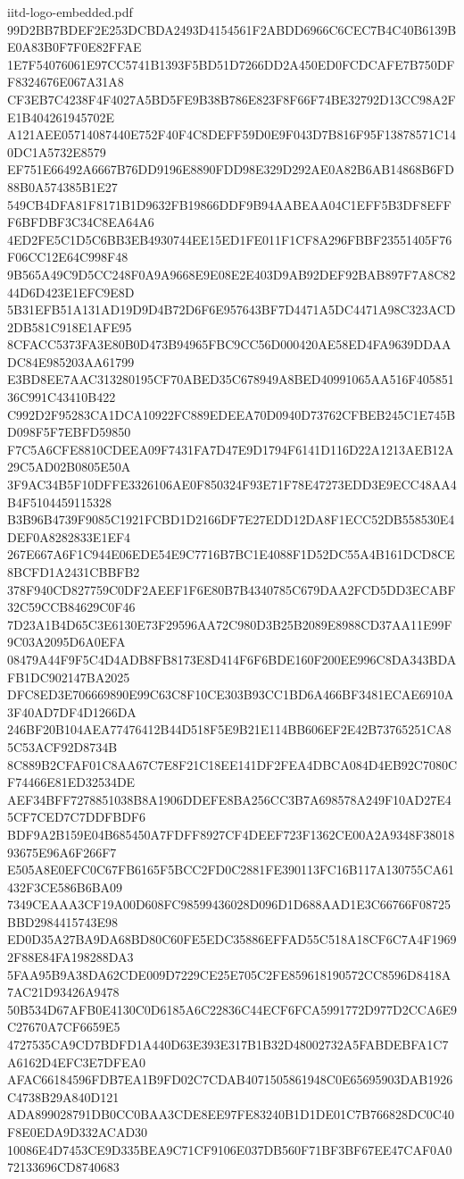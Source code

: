 \begin{filecontents*}[overwrite]{iitd-logo-embedded.pdf}
99D2BB7BDEF2E253DCBDA2493D4154561F2ABDD6966C6CEC7B4C40B6139BE0A83B0F7F0E82FFAE
1E7F54076061E97CC5741B1393F5BD51D7266DD2A450ED0FCDCAFE7B750DFF8324676E067A31A8
CF3EB7C4238F4F4027A5BD5FE9B38B786E823F8F66F74BE32792D13CC98A2FE1B404261945702E
A121AEE05714087440E752F40F4C8DEFF59D0E9F043D7B816F95F13878571C140DC1A5732E8579
EF751E66492A6667B76DD9196E8890FDD98E329D292AE0A82B6AB14868B6FD88B0A574385B1E27
549CB4DFA81F8171B1D9632FB19866DDF9B94AABEAA04C1EFF5B3DF8EFFF6BFDBF3C34C8EA64A6
4ED2FE5C1D5C6BB3EB4930744EE15ED1FE011F1CF8A296FBBF23551405F76F06CC12E64C998F48
9B565A49C9D5CC248F0A9A9668E9E08E2E403D9AB92DEF92BAB897F7A8C8244D6D423E1EFC9E8D
5B31EFB51A131AD19D9D4B72D6F6E957643BF7D4471A5DC4471A98C323ACD2DB581C918E1AFE95
8CFACC5373FA3E80B0D473B94965FBC9CC56D000420AE58ED4FA9639DDAADC84E985203AA61799
E3BD8EE7AAC313280195CF70ABED35C678949A8BED40991065AA516F40585136C991C43410B422
C992D2F95283CA1DCA10922FC889EDEEA70D0940D73762CFBEB245C1E745BD098F5F7EBFD59850
F7C5A6CFE8810CDEEA09F7431FA7D47E9D1794F6141D116D22A1213AEB12A29C5AD02B0805E50A
3F9AC34B5F10DFFE3326106AE0F850324F93E71F78E47273EDD3E9ECC48AA4B4F5104459115328
B3B96B4739F9085C1921FCBD1D2166DF7E27EDD12DA8F1ECC52DB558530E4DEF0A8282833E1EF4
267E667A6F1C944E06EDE54E9C7716B7BC1E4088F1D52DC55A4B161DCD8CE8BCFD1A2431CBBFB2
378F940CD827759C0DF2AEEF1F6E80B7B4340785C679DAA2FCD5DD3ECABF32C59CCB84629C0F46
7D23A1B4D65C3E6130E73F29596AA72C980D3B25B2089E8988CD37AA11E99F9C03A2095D6A0EFA
08479A44F9F5C4D4ADB8FB8173E8D414F6F6BDE160F200EE996C8DA343BDAFB1DC902147BA2025
DFC8ED3E706669890E99C63C8F10CE303B93CC1BD6A466BF3481ECAE6910A3F40AD7DF4D1266DA
246BF20B104AEA77476412B44D518F5E9B21E114BB606EF2E42B73765251CA85C53ACF92D8734B
8C889B2CFAF01C8AA67C7E8F21C18EE141DF2FEA4DBCA084D4EB92C7080CF74466E81ED32534DE
AEF34BFF7278851038B8A1906DDEFE8BA256CC3B7A698578A249F10AD27E45CF7CED7C7DDFBDF6
BDF9A2B159E04B685450A7FDFF8927CF4DEEF723F1362CE00A2A9348F3801893675E96A6F266F7
E505A8E0EFC0C67FB6165F5BCC2FD0C2881FE390113FC16B117A130755CA61432F3CE586B6BA09
7349CEAAA3CF19A00D608FC98599436028D096D1D688AAD1E3C66766F08725BBD2984415743E98
ED0D35A27BA9DA68BD80C60FE5EDC35886EFFAD55C518A18CF6C7A4F19692F88E84FA198288DA3
5FAA95B9A38DA62CDE009D7229CE25E705C2FE859618190572CC8596D8418A7AC21D93426A9478
50B534D67AFB0E4130C0D6185A6C22836C44ECF6FCA5991772D977D2CCA6E9C27670A7CF6659E5
4727535CA9CD7BDFD1A440D63E393E317B1B32D48002732A5FABDEBFA1C7A6162D4EFC3E7DFEA0
AFAC66184596FDB7EA1B9FD02C7CDAB4071505861948C0E65695903DAB1926C4738B29A840D121
ADA899028791DB0CC0BAA3CDE8EE97FE83240B1D1DE01C7B766828DC0C40F8E0EDA9D332ACAD30
10086E4D7453CE9D335BEA9C71CF9106E037DB560F71BF3BF67EE47CAF0A072133696CD8740683

\end{filecontents*}

